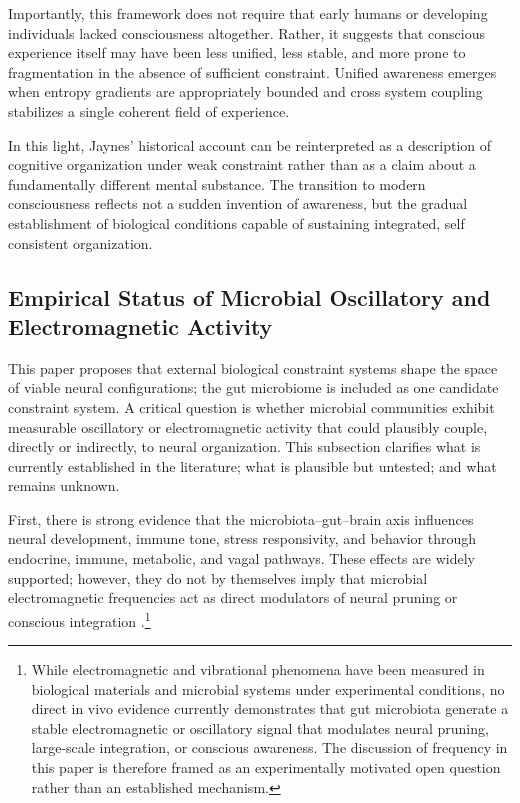 \documentclass[12pt,letterpaper]{article}
\begin{document}
Importantly, this framework does not require that early humans or developing individuals lacked consciousness altogether. Rather, it suggests that conscious experience itself may have been less unified, less stable, and more prone to fragmentation in the absence of sufficient constraint. Unified awareness emerges when entropy gradients are appropriately bounded and cross system coupling stabilizes a single coherent field of experience.

In this light, Jaynes' historical account can be reinterpreted as a description of cognitive organization under weak constraint rather than as a claim about a fundamentally different mental substance. The transition to modern consciousness reflects not a sudden invention of awareness, but the gradual establishment of biological conditions capable of sustaining integrated, self consistent organization.

\subsection{Empirical Status of Microbial Oscillatory and Electromagnetic Activity}

This paper proposes that external biological constraint systems shape the space of viable neural configurations; the gut microbiome is included as one candidate constraint system. A critical question is whether microbial communities exhibit measurable oscillatory or electromagnetic activity that could plausibly couple, directly or indirectly, to neural organization. This subsection clarifies what is currently established in the literature; what is plausible but untested; and what remains unknown.

First, there is strong evidence that the microbiota--gut--brain axis influences neural development, immune tone, stress responsivity, and behavior through endocrine, immune, metabolic, and vagal pathways. These effects are widely supported; however, they do not by themselves imply that microbial electromagnetic frequencies act as direct modulators of neural pruning or conscious integration \cite{cryan2012, martin2018, cryan2019physrev}.\footnote{While electromagnetic and vibrational phenomena have been measured in biological materials and microbial systems under experimental conditions, no direct in vivo evidence currently demonstrates that gut microbiota generate a stable electromagnetic or oscillatory signal that modulates neural pruning, large-scale integration, or conscious awareness. The discussion of frequency in this paper is therefore framed as an experimentally motivated open question rather than an established mechanism.}
\end{document}
